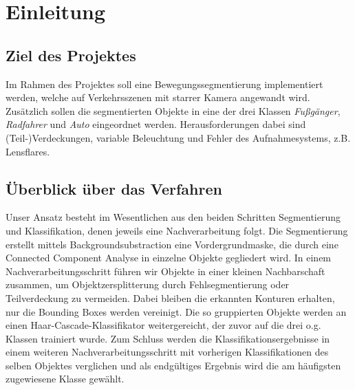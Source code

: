 \documentclass[conference]{IEEEtran}
\begin{document}

%
\IEEEpeerreviewmaketitle



\section{Einleitung}

 


\subsection{Ziel des Projektes}

Im Rahmen des Projektes soll eine Bewegungssegmentierung implementiert werden, welche auf Verkehrsszenen mit starrer Kamera angewandt wird. Zusätzlich sollen die segmentierten Objekte in eine der drei Klassen \textit{Fußgänger}, \textit{Radfahrer} und \textit{Auto} eingeordnet werden. Herausforderungen dabei sind (Teil-)Verdeckungen, variable Beleuchtung und Fehler des Aufnahmesystems, z.B. Lensflares.

\subsection{Überblick über das Verfahren}

Unser Ansatz besteht im Wesentlichen aus den beiden Schritten Segmentierung und Klassifikation, denen jeweils eine Nachverarbeitung folgt. Die Segmentierung erstellt mittels Backgroundsubstraction eine Vordergrundmaske, die durch eine Connected Component Analyse in einzelne Objekte gegliedert wird. In einem Nachverarbeitungsschritt führen wir Objekte in einer kleinen Nachbarschaft zusammen, um Objektzersplitterung durch Fehlsegmentierung oder Teilverdeckung zu vermeiden. Dabei bleiben die erkannten Konturen erhalten, nur die Bounding Boxes werden vereinigt. Die so gruppierten Objekte werden an einen Haar-Cascade-Klassifikator weitergereicht, der zuvor auf die drei o.g. Klassen trainiert wurde. Zum Schluss werden die Klassifikationsergebnisse in einem weiteren Nachverarbeitungsschritt mit vorherigen Klassifikationen des selben Objektes verglichen und als endgültiges Ergebnis wird die am häufigsten zugewiesene Klasse gewählt.
\end{document}
